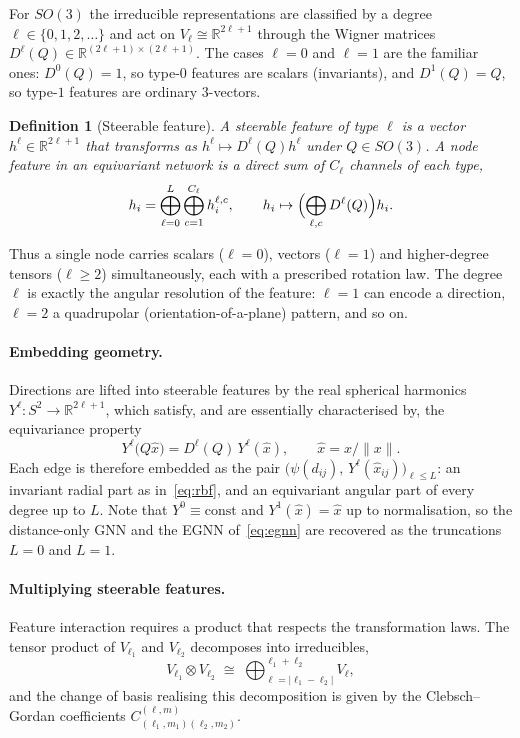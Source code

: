 \documentclass[a4paper,12pt]{article}
\newtheorem{definition}[theorem]{Definition}
\theoremstyle{remark}
\begin{document}
For $SO(3)$ the irreducible representations are classified by a degree
$\ell\in\{0,1,2,\dots\}$ and act on $V_\ell\cong\mathbb R^{2\ell+1}$ through the Wigner
matrices $D^{\ell}(Q)\in\mathbb R^{(2\ell+1)\times(2\ell+1)}$. The cases $\ell=0$ and
$\ell=1$ are the familiar ones: $D^0(Q)=1$, so type-$0$ features are scalars
(invariants), and $D^1(Q)=Q$, so type-$1$ features are ordinary $3$-vectors.

\begin{definition}[Steerable feature]
\label{def:steerable}
A \emph{steerable feature} of type $\ell$ is a vector $h^{\ell}\in\mathbb R^{2\ell+1}$
that transforms as $h^{\ell}\mapsto D^{\ell}(Q)h^{\ell}$ under $Q\in SO(3)$. A node
feature in an equivariant network is a direct sum of $C_\ell$ channels of each type,
\[
h_i=\bigoplus_{\ell=0}^{L}\bigoplus_{c=1}^{C_\ell}h_{i}^{\ell,c},
\qquad
h_i\mapsto\Bigl(\bigoplus_{\ell,c}D^\ell(Q)\Bigr)h_i .
\]
\end{definition}

Thus a single node carries scalars ($\ell=0$), vectors ($\ell=1$) and higher-degree
tensors ($\ell\ge2$) simultaneously, each with a prescribed rotation law. The degree
$\ell$ is exactly the angular resolution of the feature: $\ell=1$ can encode a direction,
$\ell=2$ a quadrupolar (orientation-of-a-plane) pattern, and so on.

\paragraph{Embedding geometry.}
Directions are lifted into steerable features by the real spherical harmonics
$Y^{\ell}:S^2\to\mathbb R^{2\ell+1}$, which satisfy, and are essentially characterised by,
the equivariance property
\begin{equation}
\label{eq:sph-equivariance}
Y^{\ell}\bigl(Q\hat x\bigr)
=
D^{\ell}(Q)\,Y^{\ell}(\hat x),
\qquad
\hat x=x/\|x\| .
\end{equation}
Each edge is therefore embedded as the pair
$\bigl(\psi(d_{ij}),\,Y^{\ell}(\hat x_{ij})\bigr)_{\ell\le L}$: an invariant radial part
as in~\eqref{eq:rbf}, and an equivariant angular part of every degree up to $L$. Note
that $Y^0\equiv\mathrm{const}$ and $Y^1(\hat x)=\hat x$ up to normalisation, so the
distance-only GNN and the EGNN of~\eqref{eq:egnn} are recovered as the truncations
$L=0$ and $L=1$.

\paragraph{Multiplying steerable features.}
Feature interaction requires a product that respects the transformation laws. The
tensor product of $V_{\ell_1}$ and $V_{\ell_2}$ decomposes into irreducibles,
\[
V_{\ell_1}\otimes V_{\ell_2}
\;\cong\;
\bigoplus_{\ell=|\ell_1-\ell_2|}^{\ell_1+\ell_2}V_{\ell},
\]
and the change of basis realising this decomposition is given by the Clebsch--Gordan
coefficients $C^{(\ell,m)}_{(\ell_1,m_1)(\ell_2,m_2)}$.
\end{document}
